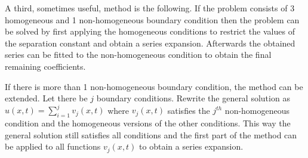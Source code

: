    \begin{method}
        A third, sometimes useful, method is the following. If the problem consists of 3 homogeneous and 1 non-homogeneous boundary condition then the problem can be solved by first applying the homogeneous conditions to restrict the values of the separation constant and obtain a series expansion. Afterwards the obtained series can be fitted to the non-homogeneous condition to obtain the final remaining coefficients.

        If there is more than 1 non-homogeneous boundary condition, the method can be extended. Let there be $j$ boundary conditions. Rewrite the general solution as $u(x, t) = \sum_{i=1}^jv_j(x, t)$ where $v_j(x, t)$ satisfies the $j^{th}$ non-homogeneous condition and the homogeneous versions of the other conditions. This way the general solution still satisfies all conditions and the first part of the method can be applied to all functions $v_j(x, t)$ to obtain a series expansion.
    \end{method}


